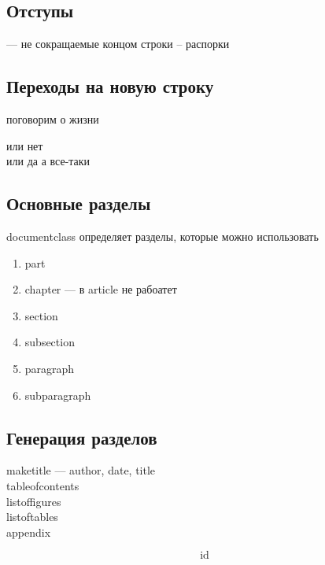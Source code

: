     \subsection{Отступы}

    \hspace{5px} \vspace{5px} 
    \hspace*{5px} \vspace*{5px} –-- не сокращаемые концом строки
    \hfill \vfill – распорки

    \subsection{Переходы на новую строку}

    поговорим о жизни 
    \par или нет
    \\ или да
    \newline а все-таки

    \subsection[Секции]{Основные разделы}
    documentclass определяет разделы, которые можно использовать
    \begin{enumerate}
        \item part
        \item chapter –-- в article не рабоатет
        \item section
        \item subsection
        \item paragraph
        \item subparagraph
    \end{enumerate}


    \subsection{Генерация разделов}

    \noindent maketitle –-- author, date, title
    \\ tableofcontents
    \\ listoffigures
    \\ listoftables
    \\ appendix

    $$\mathrm{id}$$


    

